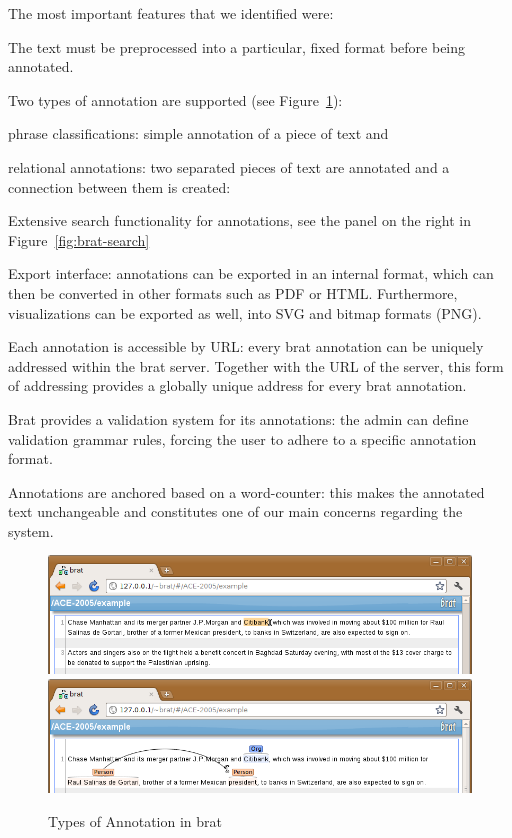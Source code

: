 The most important features that we identified were:
\begin{compactenum}
\item The text must be preprocessed into a particular, fixed format before being
  annotated.
\item Two types of annotation are supported (see Figure~\ref{fig:brat-annotations}):
  \begin{compactitem}
  \item phrase classifications: simple annotation of a piece of text and
  \item relational annotations: two separated pieces of text are annotated and a
    connection between them is created:
 \end{compactitem}
\item Extensive search functionality for annotations, see the panel on the right in
  Figure~\ref{fig:brat-search}
\item Export interface: annotations can be exported in an internal format, which can then
  be converted in other formats such as PDF or HTML. Furthermore, visualizations can be
  exported as well, into SVG and bitmap formats (PNG).
\item Each annotation is accessible by URL: every brat annotation can be uniquely
  addressed within the brat server. Together with the URL of the server, this form of
  addressing provides a globally unique address for every brat annotation.
\item Brat provides a validation system for its annotations: the admin can define
  validation grammar rules, forcing the user to adhere to a specific annotation format.
\item Annotations are anchored based on a word-counter: this makes the annotated text
  unchangeable and constitutes one of our main concerns regarding the system.
\end{compactenum}
\begin{figure}[ht]\centering
  \includegraphics[width=.47\textwidth]{../PIC/brat-text-span}\quad
  \includegraphics[width=.47\textwidth]{../PIC/brat-relation}
  \caption{Types of Annotation in brat}\label{fig:brat-annotations}
\end{figure}


